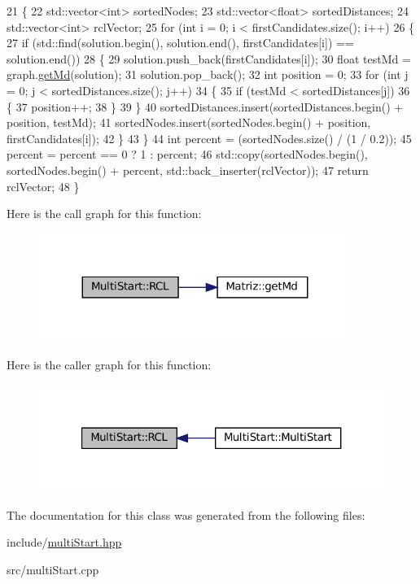 \begin{DoxyCode}
21 \{
22   std::vector<int> sortedNodes;
23   std::vector<float> sortedDistances;
24   std::vector<int> rclVector;
25   \textcolor{keywordflow}{for} (\textcolor{keywordtype}{int} i = 0; i < firstCandidates.size(); i++)
26   \{
27     \textcolor{keywordflow}{if} (std::find(solution.begin(), solution.end(), firstCandidates[i]) == solution.end())
28     \{
29       solution.push\_back(firstCandidates[i]);
30       \textcolor{keywordtype}{float} testMd = graph.\hyperlink{classMatriz_a8df14a27d791f24206dd633b2a685c5b}{getMd}(solution);
31       solution.pop\_back();
32       \textcolor{keywordtype}{int} position = 0;
33       \textcolor{keywordflow}{for} (\textcolor{keywordtype}{int} j = 0; j < sortedDistances.size(); j++)
34       \{
35         \textcolor{keywordflow}{if} (testMd < sortedDistances[j])
36         \{
37           position++;
38         \}
39       \}
40       sortedDistances.insert(sortedDistances.begin() + position, testMd);
41       sortedNodes.insert(sortedNodes.begin() + position, firstCandidates[i]);
42     \}
43   \}
44   \textcolor{keywordtype}{int} percent = (sortedNodes.size() / (1 / 0.2));
45   percent = percent == 0 ? 1 : percent;
46   std::copy(sortedNodes.begin(), sortedNodes.begin() + percent, std::back\_inserter(rclVector));
47   \textcolor{keywordflow}{return} rclVector;
48 \}
\end{DoxyCode}
Here is the call graph for this function\+:
\nopagebreak
\begin{figure}[H]
\begin{center}
\leavevmode
\includegraphics[width=287pt]{classMultiStart_a456dc441b6e7028aa86a0488830f9bc1_cgraph}
\end{center}
\end{figure}
Here is the caller graph for this function\+:
\nopagebreak
\begin{figure}[H]
\begin{center}
\leavevmode
\includegraphics[width=321pt]{classMultiStart_a456dc441b6e7028aa86a0488830f9bc1_icgraph}
\end{center}
\end{figure}


The documentation for this class was generated from the following files\+:\begin{DoxyCompactItemize}
\item 
include/\hyperlink{multiStart_8hpp}{multi\+Start.\+hpp}\item 
src/multi\+Start.\+cpp\end{DoxyCompactItemize}
